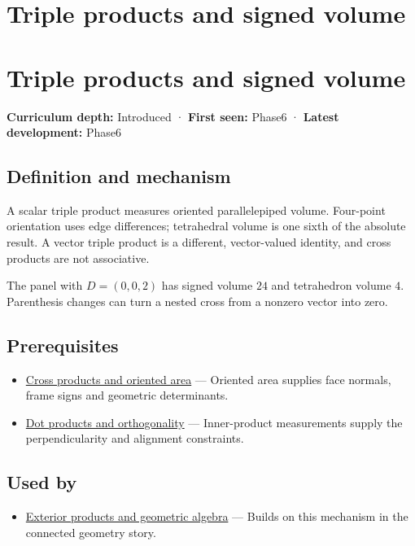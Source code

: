 \hypertarget{appendix-5caa058bd9c7}{}
\section*{Triple products and signed volume}
\section{Triple products and signed volume}\label{appendix-5caa058bd9c7-triple-products-and-signed-volume}

\textbf{Curriculum depth:} Introduced · \textbf{First seen:} Phase6 · \textbf{Latest development:} Phase6

\subsection{Definition and mechanism}\label{appendix-5caa058bd9c7-definition-and-mechanism}

A scalar triple product measures oriented parallelepiped volume. Four-point orientation uses edge differences; tetrahedral volume is one sixth of the absolute result. A vector triple product is a different, vector-valued identity, and cross products are not associative.

The panel with \(D=(0,0,2)\) has signed volume \(24\) and tetrahedron volume \(4\). Parenthesis changes can turn a nested cross from a nonzero vector into zero.

\subsection{Prerequisites}\label{appendix-5caa058bd9c7-prerequisites}

\begin{itemize}
\tightlist
\item
  \hyperref[appendix-2391db8052b1]{Cross products and oriented area} --- Oriented area supplies face normals, frame signs and geometric determinants.
\item
  \hyperref[appendix-8bc4e8fc547c]{Dot products and orthogonality} --- Inner-product measurements supply the perpendicularity and alignment constraints.
\end{itemize}

\subsection{Used by}\label{appendix-5caa058bd9c7-used-by}

\begin{itemize}
\tightlist
\item
  \hyperref[appendix-e1960925d1b8]{Exterior products and geometric algebra} --- Builds on this mechanism in the connected geometry story.
\end{itemize}

